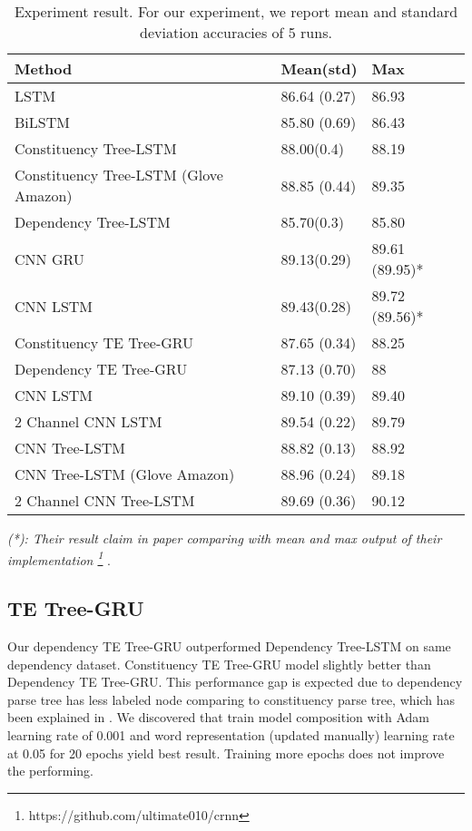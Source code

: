 \begin{table}[H]
	\centering
	\caption{Experiment result. For our experiment, we report mean and standard deviation accuracies of 5 runs.}
	\label{table:experimentresult}
	\begin{tabular}{lll}
		Method                                   & Mean(std) & Max   \\ \hline
		LSTM                                     & 86.64 (0.27) & 86.93  \\
		BiLSTM                                   & 85.80 (0.69) & 86.43   \\ \hline
		Constituency Tree-LSTM \cite{treeLSTM} & 88.00(0.4)    &   88.19\\
		Constituency Tree-LSTM \cite{treeLSTM} (Glove Amazon) & 88.85 (0.44) & 89.35 \\
		Dependency Tree-LSTM  \cite{treeLSTM}  & 85.70(0.3)  & 85.80 \\
		CNN GRU \cite{cnn-rnn}					& 89.13(0.29)  &  89.61 (89.95)*	\\
		CNN LSTM \cite{cnn-rnn}					& 89.43(0.28)  & 89.72 (89.56)*	\\ \hline
		Constituency TE Tree-GRU                 & 87.65 (0.34) & 88.25 \\
		Dependency TE Tree-GRU                   & 87.13  (0.70)  & 88 \\ \hline
		CNN LSTM 								& 89.10 (0.39)  & 89.40   \\
		2 Channel CNN LSTM						& 89.54	(0.22) & 89.79	\\
		CNN Tree-LSTM                            & 88.82 (0.13) & 88.92 \\
		CNN Tree-LSTM (Glove Amazon) 			& 88.96 (0.24) & 89.18 \\
		2 Channel CNN Tree-LSTM  				& 89.69 (0.36) & 90.12
	\end{tabular}
\end{table}

\textit{(*): Their result claim in paper comparing with mean and max output of their implementation
\footnote{https://github.com/ultimate010/crnn}} .


\subsection{TE Tree-GRU}
Our dependency TE Tree-GRU outperformed Dependency Tree-LSTM on same dependency dataset. Constituency TE Tree-GRU model slightly better than Dependency TE Tree-GRU. This performance gap is expected due to dependency parse tree has less labeled node comparing to constituency parse tree, which has been explained in \cite{treeLSTM}. We discovered that train model composition with Adam learning rate of 0.001 and word representation (updated manually) learning rate at 0.05 for 20 epochs yield best result. Training more epochs does not improve the performing.


